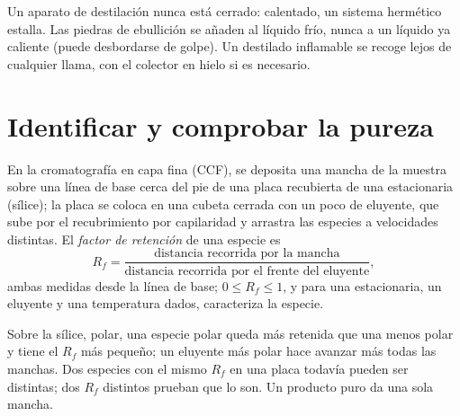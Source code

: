 \begin{safety}{}
Un aparato de destilación nunca está cerrado: calentado, un sistema
hermético estalla. Las piedras de ebullición se añaden al líquido frío,
nunca a un líquido ya caliente (puede desbordarse de golpe). Un destilado
inflamable se recoge lejos de cualquier llama, con el colector en hielo
si es necesario.
\end{safety}

\section{Identificar y comprobar la pureza}

\begin{definition}\label{def:b1:lab-techniques-1:retention-factor}
En la cromatografía en capa fina (CCF), se deposita una mancha de la
muestra sobre una línea de base cerca del pie de una placa recubierta de
una  estacionaria (sílice); la placa se coloca en una cubeta cerrada
con un poco de eluyente, que sube por el recubrimiento por capilaridad y
arrastra las especies a velocidades distintas. El \emph{factor de
retención} de una especie es
\[
  R_f = \frac{\text{distancia recorrida por la mancha}}
             {\text{distancia recorrida por el frente del eluyente}},
\]
ambas medidas desde la línea de base; $0 \le R_f \le 1$, y para una 
estacionaria, un eluyente y una temperatura dados, caracteriza la
especie.
\end{definition}

Sobre la sílice, polar, una especie polar queda más retenida que una
menos polar y tiene el $R_f$ más pequeño; un eluyente más polar hace
avanzar más todas las manchas. Dos especies con el mismo $R_f$ en una
placa todavía pueden ser distintas; dos $R_f$ distintos prueban que lo
son. Un producto puro da una sola mancha.

